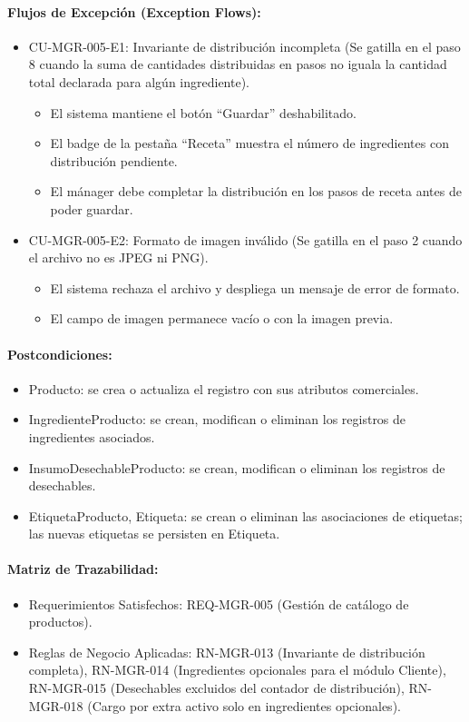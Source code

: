 \paragraph{Flujos de Excepción (Exception Flows):}
\begin{itemize}
    \item CU-MGR-005-E1: Invariante de distribución incompleta (Se gatilla en el paso 8 cuando la suma de cantidades distribuidas en pasos no iguala la cantidad total declarada para algún ingrediente).
    \begin{itemize}
        \item El sistema mantiene el botón ``Guardar'' deshabilitado.
        \item El badge de la pestaña ``Receta'' muestra el número de ingredientes con distribución pendiente.
        \item El mánager debe completar la distribución en los pasos de receta antes de poder guardar.
    \end{itemize}
    \item CU-MGR-005-E2: Formato de imagen inválido (Se gatilla en el paso 2 cuando el archivo no es JPEG ni PNG).
    \begin{itemize}
        \item El sistema rechaza el archivo y despliega un mensaje de error de formato.
        \item El campo de imagen permanece vacío o con la imagen previa.
    \end{itemize}
\end{itemize}

\paragraph{Postcondiciones:}
\begin{itemize}
    \item Producto: se crea o actualiza el registro con sus atributos comerciales.
    \item IngredienteProducto: se crean, modifican o eliminan los registros de ingredientes asociados.
    \item InsumoDesechableProducto: se crean, modifican o eliminan los registros de desechables.
    \item EtiquetaProducto, Etiqueta: se crean o eliminan las asociaciones de etiquetas; las nuevas etiquetas se persisten en Etiqueta.
\end{itemize}

\paragraph{Matriz de Trazabilidad:}
\begin{itemize}
    \item Requerimientos Satisfechos: REQ-MGR-005 (Gestión de catálogo de productos).
    \item Reglas de Negocio Aplicadas: RN-MGR-013 (Invariante de distribución completa), RN-MGR-014 (Ingredientes opcionales para el módulo Cliente), RN-MGR-015 (Desechables excluidos del contador de distribución), RN-MGR-018 (Cargo por extra activo solo en ingredientes opcionales).
\end{itemize}

